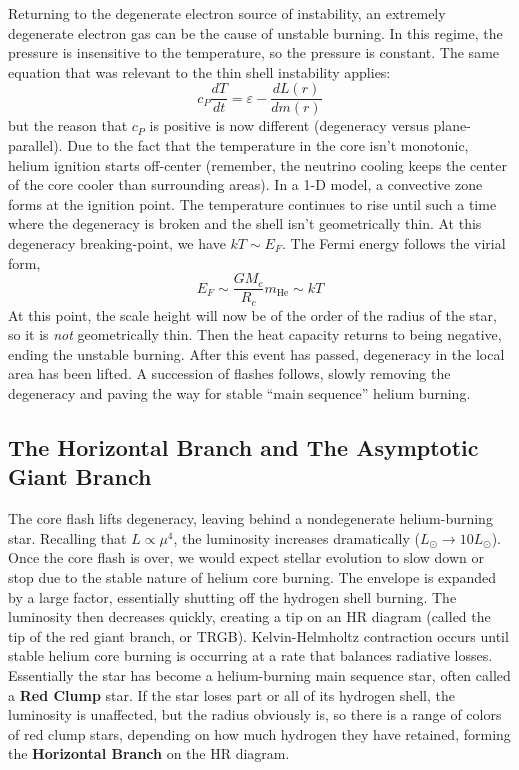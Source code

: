 \documentclass[10pt]{article}
\numberwithin{equation}{section}
\newcommand{\n}{\noindent}
\begin{document}
    \n Returning to the degenerate electron source of instability,
    an extremely degenerate electron gas can be the cause of unstable
    burning. In this regime, the pressure is insensitive to the
    temperature, so the pressure is constant. The same equation that
    was relevant to the thin shell instability applies:
    \begin{equation}
      \label{eq:289}
      c_P\frac{dT}{dt}=\varepsilon-\frac{dL(r)}{dm(r)}
    \end{equation}
    but the reason that $c_P$ is positive is now different (degeneracy
    versus plane-parallel). Due to the fact that the temperature in
    the core isn't monotonic, helium ignition starts off-center
    (remember, the neutrino cooling keeps the center of the core
    cooler than surrounding areas). In a 1-D model, a convective zone
    forms at the ignition point. The temperature continues to rise
    until such a time where the degeneracy is broken and the shell
    isn't geometrically thin. At this degeneracy breaking-point, we
    have $kT\sim E_F$. The Fermi energy follows the virial form,
    \begin{equation}
      \label{eq:290}
      E_F\sim \frac{G M_c}{R_c}m_{\mathrm{He}}\sim kT
    \end{equation}
    At this point, the scale height will now be of the order of the
    radius of the star, so it is \emph{not} geometrically thin. Then
    the heat capacity returns to being negative, ending the unstable
    burning. After this event has passed, degeneracy in the local area
    has been lifted. A succession of flashes follows, slowly removing
    the degeneracy and paving the way for stable ``main sequence''
    helium burning.

    \subsection{The Horizontal Branch and The Asymptotic Giant Branch}
    \label{sec:horizontal-branch}

    The core flash lifts degeneracy, leaving behind a nondegenerate
    helium-burning star. Recalling that $L\propto \mu^4$, the
    luminosity increases dramatically ($L_\odot\to 10L_\odot$). Once
    the core flash is over, we would expect stellar evolution to slow
    down or stop due to the stable nature of helium core
    burning. The envelope is expanded by a large factor, essentially
    shutting off the hydrogen shell burning. The luminosity then
    decreases quickly, creating a tip on an HR diagram (called the
    tip of the red giant branch, or TRGB). Kelvin-Helmholtz
    contraction occurs until stable helium core burning is occurring at
    a rate that balances radiative losses. Essentially the star has
    become a helium-burning main sequence star, often called a
    \textbf{Red Clump} star. If the star loses part or all of its
    hydrogen shell, the luminosity is unaffected, but the radius
    obviously is, so there is a range of colors of red clump stars,
    depending on how much hydrogen they have retained, forming the
    \textbf{Horizontal Branch} on the HR diagram.\\
\end{document}
